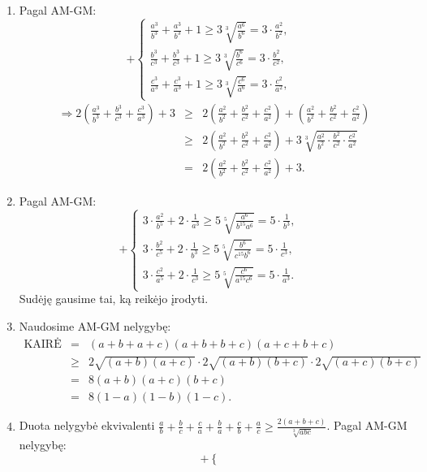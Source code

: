 \begin{enumerate}
$$\begin{array}{ll}
\sqrt{a}+\sqrt{b}+\sqrt{c}\geq3\sqrt[3]{\sqrt{abc}}=3.&\end{array}\right.$$
Viską sudėję gausime norimą rezultatą.
\item 
Pagal AM-GM: $$+\left\{\begin{array}{ll}
\frac{a^3}{b^3}+\frac{a^3}{b^3}+1\geq3\sqrt[3]{\frac{a^6}{b^6}}=3\cdot\frac{a^2}{b^2},&\\
\frac{b^3}{c^3}+\frac{b^3}{c^3}+1\geq3\sqrt[3]{\frac{b^6}{c^6}}=3\cdot\frac{b^2}{c^2},&\\
\frac{c^3}{a^3}+\frac{c^3}{a^3}+1\geq3\sqrt[3]{\frac{c^6}{a^6}}=3\cdot\frac{c^2}{a^2},&\end{array}\right.$$
\begin{eqnarray*}
\Rightarrow2\left(\frac{a^3}{b^3}+\frac{b^3}{c^3}+\frac{c^3}{a^3}\right)+
3&\geq&2\left(\frac{a^2}{b^2}+\frac{b^2}{c^2}+\frac{c^2}{a^2}\right)+
\left(\frac{a^2}{b^2}+\frac{b^2}{c^2}+\frac{c^2}{a^2}\right)\\
&\geq&2\left(\frac{a^2}{b^2}+\frac{b^2}{c^2}+\frac{c^2}{a^2}\right)+
3\sqrt[3]{\frac{a^2}{b^2}\cdot\frac{b^2}{c^2}\cdot\frac{c^2}{a^2}}\\
&=&2\left(\frac{a^2}{b^2}+\frac{b^2}{c^2}+\frac{c^2}{a^2}\right)+3.
\end{eqnarray*}
\item 
Pagal AM-GM: $$+\left\{\begin{array}{ll}
3\cdot\frac{a^2}{b^5}+2\cdot\frac{1}{a^3}\geq5\sqrt[5]{\frac{a^6}{b^{15}a^6}}=5\cdot\frac{1}{b^3},&\\
3\cdot\frac{b^2}{c^5}+2\cdot\frac{1}{b^3}\geq5\sqrt[5]{\frac{b^6}{c^{15}b^6}}=5\cdot\frac{1}{c^3},&\\
3\cdot\frac{c^2}{a^5}+2\cdot\frac{1}{c^3}\geq5\sqrt[5]{\frac{c^6}{a^{15}c^6}}=5\cdot\frac{1}{a^3}.&
\end{array} \right. $$ Sudėję gausime tai, ką reikėjo įrodyti.
\item 
Naudosime AM-GM nelygybę: \begin{eqnarray*} \mbox{KAIRĖ
PUSĖ}&=&(a+b+a+c)(a+b+b+c)(a+c+b+c)\\
&\geq&2\sqrt{(a+b)(a+c)}\cdot2\sqrt{(a+b)(b+c)}\cdot2\sqrt{(a+c)(b+c)}\\
&=&8(a+b)(a+c)(b+c)\\ &=&8(1-a)(1-b)(1-c). \end{eqnarray*}
\item 
Duota nelygybė ekvivalenti $\frac{a}{b}+\frac{b}{c}+\frac{c}{a}+\frac{b}{a}+\frac{c}{b}+\frac{a}{c}\geq\frac{2(a+b+c)}{\sqrt[3]{abc}}$.
Pagal AM-GM nelygybę: $$+\left\{\begin{array}{ll}

\end{array}$$
\end{enumerate}
